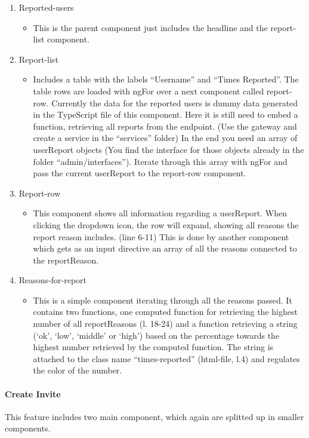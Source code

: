\begin{enumerate}
\item Reported-users
   \begin{itemize}
     \item This is the parent component just includes the headline and the report-list component.
   \end{itemize}
\item Report-list
   \begin{itemize}
        \item Includes a table with the labels “Username” and “Times Reported”. The table rows are loaded with ngFor over a next component called report-row. Currently the data for the reported users is dummy data generated in the TypeScript file of this component. Here it is still need to embed a function, retrieving all reports from the endpoint. (Use the gateway and create a service in the “services” folder) In the end you need an array of userReport objects (You find the interface for those objects already in the folder “admin/interfaces”). Iterate through this array with ngFor and pass the current userReport to the report-row component.
   \end{itemize}
\item Report-row
   \begin{itemize}
       \item This component shows all information regarding a userReport. When clicking the dropdown icon, the row will expand, showing all reasons the report reason includes. (line 6-11) This is done by another component which gets as an input
       directive an array of all the reasons connected to the reportReason.
   \end{itemize}
\item Reasons-for-report
   \begin{itemize}
      \item This is a simple component iterating through all the reasons passed.
      It contains two functions, one computed function for retrieving the highest number of all reportReasons (l. 18-24) and a function retrieving a string (‘ok’, ‘low’, ‘middle’ or ‘high’) based on the percentage towards the highest number retrieved by the computed function. The string is attached to the class name “times-reported” (html-file, l.4) and regulates the color of the number.
   \end{itemize}
\end{enumerate}

\paragraph{Create Invite}
This feature includes two main component, which again are splitted up in smaller components.

